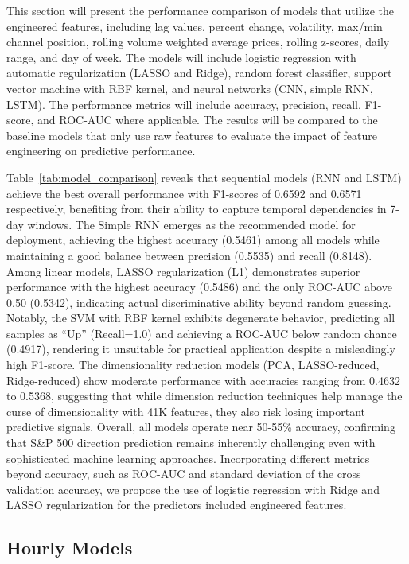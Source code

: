 \documentclass[11pt]{article}
\begin{document}
This section will present the performance comparison of models that utilize the engineered features, including lag values, percent change, volatility, max/min channel position, rolling volume weighted average prices, rolling z-scores, daily range, and day of week. The models will include logistic regression with automatic regularization (LASSO and Ridge), random forest classifier, support vector machine with RBF kernel, and neural networks (CNN, simple RNN, LSTM). The performance metrics will include accuracy, precision, recall, F1-score, and ROC-AUC where applicable. The results will be compared to the baseline models that only use raw features to evaluate the impact of feature engineering on predictive performance.


\FloatBarrier

Table~\ref{tab:model_comparison} reveals that sequential models (RNN and LSTM) achieve the best overall performance with F1-scores of 0.6592 and 0.6571 respectively, benefiting from their ability to capture temporal dependencies in 7-day windows. The Simple RNN emerges as the recommended model for deployment, achieving the highest accuracy (0.5461) among all models while maintaining a good balance between precision (0.5535) and recall (0.8148). Among linear models, LASSO regularization (L1) demonstrates superior performance with the highest accuracy (0.5486) and the only ROC-AUC above 0.50 (0.5342), indicating actual discriminative ability beyond random guessing. Notably, the SVM with RBF kernel exhibits degenerate behavior, predicting all samples as ``Up'' (Recall=1.0) and achieving a ROC-AUC below random chance (0.4917), rendering it unsuitable for practical application despite a misleadingly high F1-score. The dimensionality reduction models (PCA, LASSO-reduced, Ridge-reduced) show moderate performance with accuracies ranging from 0.4632 to 0.5368, suggesting that while dimension reduction techniques help manage the curse of dimensionality with 41K features, they also risk losing important predictive signals. Overall, all models operate near 50-55\% accuracy, confirming that S\&P 500 direction prediction remains inherently challenging even with sophisticated machine learning approaches. Incorporating different metrics beyond accuracy, such as ROC-AUC and standard deviation of the cross validation accuracy, we propose the use of logistic regression with Ridge and LASSO regularization for the predictors included engineered features.

\subsection{Hourly Models}
\end{document}
